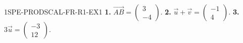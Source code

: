 
\begin{corrige}{1SPE-PRODSCAL-FR-R1-EX1}
\textbf{1.} $\overrightarrow{AB} = \begin{pmatrix} 3 \\ -4 \end{pmatrix}$.
\textbf{2.} $\vec{u} + \vec{v} = \begin{pmatrix} -1 \\ 4 \end{pmatrix}$.
\textbf{3.} $3\vec{u} = \begin{pmatrix} -3 \\ 12 \end{pmatrix}$.
\end{corrige}
